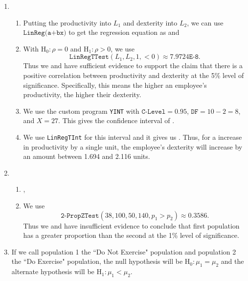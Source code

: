 \documentclass{article}
\begin{document}
\begin{enumerate}
\item \begin{enumerate}

\item Putting the productivity into $L_1$ and dexterity into $L_2$, we can use $\texttt{LinReg(a+bx)}$ to get the regression equation as  and 

\item With $\text{H}_0: \rho = 0$ and $\text{H}_1: \rho > 0$, we use $$\texttt{LinRegTTest}(L_1, L_2, 1, <0) \approx 7.9724 \texttt{E-8}.$$
Thus we  and have sufficient evidence to support the claim that there is a positive correlation between productivity and dexterity at the 5\% level of significance. Specifically, this means the higher an employee's productivity, the higher their dexterity.

\item We use the custom program \texttt{YINT} with $\texttt{C-Level} = 0.95$, $\texttt{DF} = 10-2 = 8$, and $X=27$. This gives the confidence interval of .

\item We use \texttt{LinRegTInt} for this interval and it gives us . Thus, for a increase in productivity by a single unit, the employee's dexterity will increase by an amount between 1.694 and 2.116 units.
\end{enumerate}

\item \begin{enumerate}

\item {}, 

\item We use $$\texttt{2-PropZTest}(38, 100, 50, 140, p_1 > p_2) \approx 0.3586.$$ 
Thus we  and have insufficient evidence to conclude that first population has a greater proportion than the second at the 1\% level of significance.
\end{enumerate}

\item {} If we call population 1 the ``Do Not Exercise" population and population 2 the ``Do Exercise" population, the null hypothesis will be $\text{H}_0: \mu_1 = \mu_2$ and the alternate hypothesis will be $\text{H}_1: \mu_1 < \mu_2$.


\end{enumerate}
\end{document}
